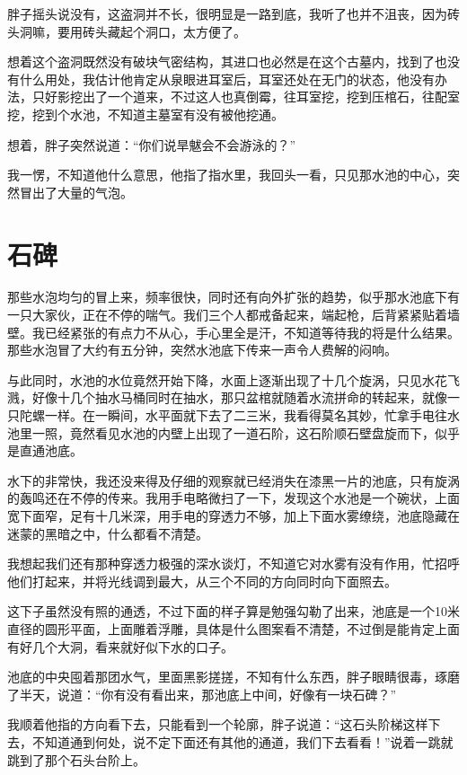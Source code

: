 胖子摇头说没有，这盗洞并不长，很明显是一路到底，我听了也并不沮丧，因为砖头洞嘛，要用砖头藏起个洞口，太方便了。

想着这个盗洞既然没有破块气密结构，其进口也必然是在这个古墓内，找到了也没有什么用处，我估计他肯定从泉眼进耳室后，耳室还处在无门的状态，他没有办法，只好影挖出了一个道来，不过这人也真倒霉，往耳室挖，挖到压棺石，往配室挖，挖到个水池，不知道主墓室有没有被他挖通。

想着，胖子突然说道：“你们说旱魃会不会游泳的？”

我一愣，不知道他什么意思，他指了指水里，我回头一看，只见那水池的中心，突然冒出了大量的气泡。

\chapter{石碑}

那些水泡均匀的冒上来，频率很快，同时还有向外扩张的趋势，似乎那水池底下有一只大家伙，正在不停的喘气。我们三个人都戒备起来，端起枪，后背紧紧贴着墙壁。我已经紧张的有点力不从心，手心里全是汗，不知道等待我的将是什么结果。那些水泡冒了大约有五分钟，突然水池底下传来一声令人费解的闷响。

与此同时，水池的水位竟然开始下降，水面上逐渐出现了十几个旋涡，只见水花飞溅，好像十几个抽水马桶同时在抽水，那只盆棺就随着水流拼命的转起来，就像一只陀螺一样。在一瞬间，水平面就下去了二三米，我看得莫名其妙，忙拿手电往水池里一照，竟然看见水池的内壁上出现了一道石阶，这石阶顺石壁盘旋而下，似乎是直通池底。

水下的非常快，我还没来得及仔细的观察就已经消失在漆黑一片的池底，只有旋涡的轰鸣还在不停的传来。我用手电略微扫了一下，发现这个水池是一个碗状，上面宽下面窄，足有十几米深，用手电的穿透力不够，加上下面水雾缭绕，池底隐藏在迷蒙的黑暗之中，什么都看不清楚。

我想起我们还有那种穿透力极强的深水谈灯，不知道它对水雾有没有作用，忙招呼他们打起来，并将光线调到最大，从三个不同的方向同时向下面照去。

这下子虽然没有照的通透，不过下面的样子算是勉强勾勒了出来，池底是一个10米直径的圆形平面，上面雕着浮雕，具体是什么图案看不清楚，不过倒是能肯定上面有好几个大洞，看来就好似下水的口子。

池底的中央囤着那团水气，里面黑影搓搓，不知有什么东西，胖子眼睛很毒，琢磨了半天，说道：“你有没有看出来，那池底上中间，好像有一块石碑？”

我顺着他指的方向看下去，只能看到一个轮廓，胖子说道：“这石头阶梯这样下去，不知道通到何处，说不定下面还有其他的通道，我们下去看看！”说着一跳就跳到了那个石头台阶上。

